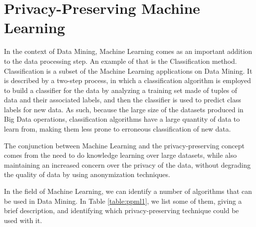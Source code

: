 \section{Privacy-Preserving Machine Learning}
\label{sec:PrivacyPreservingMachineLearning}


In the context of Data Mining, Machine Learning comes as an important addition to the data processing step. An example of that is the Classification method. Classification is a subset of the Machine Learning applications on Data Mining. It is described by a two-step process, in which a classification algorithm is employed to build a classifier for the data by analyzing a training set made of tuples of data and their associated labels, and then the classifier is used to predict class labels for new data. As such, because the large size of the datasets produced in Big Data operations, classification algorithms have a large quantity of data to learn from, making them less prone to erroneous classification of new data.

The conjunction between Machine Learning and the privacy-preserving concept comes from the need to do knowledge learning over large datasets, while also maintaining an increased concern over the privacy of the data, without degrading the quality of data by using anonymization techniques.

In the field of Machine Learning, we can identify a number of algorithms that can be used in Data Mining. In Table \ref{table:ppml1}, we list some of them, giving a brief description, and identifying which privacy-preserving technique could be used with it.

